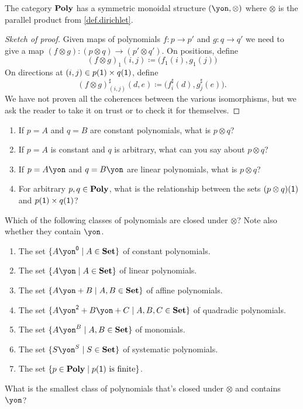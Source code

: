 \documentclass[Book-Poly]{subfiles}
\begin{document}
\begin{proposition}\label{prop.dirichlet_monoidal}
The category $\textbf{Poly}$ has a symmetric monoidal structure $(\yon,\otimes)$ where $\otimes$ is the parallel product from \cref{def.dirichlet}.
\end{proposition}
\begin{proof}[Sketch of proof]
Given maps of polynomials $f\colon p\to p'$ and $g\colon q\to q'$ we need to give a
map $(f\otimes g)\colon (p\otimes q)\to (p'\otimes q')$. On positions, define
\[
(f\otimes g)_1(i,j)\coloneqq \big(f_1(i),g_1(j)\big)
\]
On directions at $(i,j)\in p(\textsf{1})\times q(\textsf{1})$, define
\[
  (f\otimes g)^\sharp_{(i,j)}(d,e)\coloneqq
  \big(f^\sharp_i(d),g^\sharp_j(e)\big).
\]
We have not proven all the coherences between the various isomorphisms, but we ask the reader to take it on trust or to check it for themselves. 
\end{proof}

\begin{exercise}
\begin{enumerate}
	\item If $p=A$ and $q=B$ are constant polynomials, what is $p\otimes q$?
	\item If $p=A$ is constant and $q$ is arbitrary, what can you say about $p\otimes q$?
	\item If $p=A\yon$ and $q=B\yon$ are linear polynomials, what is $p\otimes q$?
	\item For arbitrary $p,q\in\textbf{Poly}$, what is the relationship between the sets $(p\otimes q)(\textsf{1})$ and $p(\textsf{1})\times q(\textsf{1})$?
\qedhere
\end{enumerate}
\end{exercise}

\begin{exercise}\label{exc.dir_closed_classes}
Which of the following classes of polynomials are closed under $\otimes$? Note also whether they contain $\yon$.
\begin{enumerate}
	\item The set $\{A\yon^\0\mid A\in\smset\}$ of constant polynomials.
	\item The set $\{A\yon\mid A\in\smset\}$ of linear polynomials.
	\item The set $\{A\yon+B\mid A,B\in\smset\}$ of affine polynomials.
	\item The set $\{A\yon^\2+B\yon+C\mid A,B,C\in\smset\}$ of quadradic polynomials.
	\item The set $\{A\yon^B\mid A,B\in\smset\}$ of monomials.
	\item The set $\{S\yon^S\mid S\in\smset\}$ of systematic polynomials.
	\item The set $\{p\in\textbf{Poly}\mid p(\textsf{1})\text{ is finite}\}$.
\end{enumerate}
What is the smallest class of polynomials that's closed under $\otimes$ and contains $\yon$?
\end{exercise}
\end{document}
